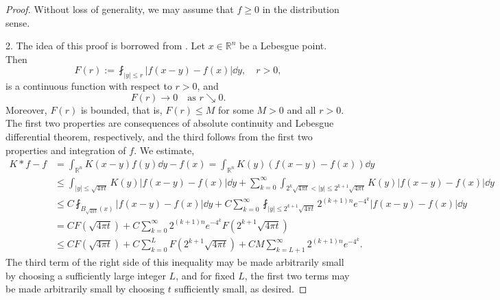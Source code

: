 \begin{proof}
	Without loss of generality, we may assume that $f\geq0$ in the distribution sense.
	
	2. The idea of this proof is borrowed from \cite[Theorem~2.1 in Chapter~3]{Stein2005}. Let $x\in\mathbb R^n$ be a Lebesgue point. Then  
	\[
	F(r) := \fint_{|y|\leq r} |f(x-y)-f(x)|\dd y,\quad r > 0,
	\]
	is a continuous function with respect to $r>0$,
	and 
	\[
	F(r)\to 0\quad \text{as }r\searrow0.
	\]
	Moreover, $F(r)$ is bounded, that is, $F(r)\leq M$ for some $M>0$ and all $r>0$. 
	The first two properties are consequences of absolute continuity and Lebesgue differential theorem, respectively, and the third follows from the first two properties and integration of $f$.
	We estimate,
	\begin{align*}
		K*f-f &= \int_{\mathbb{R}^n}K(x-y)f(y)\dd y - f(x) = \int_{\mathbb R^n}K(y)(f(x-y)-f(x))\dd y\\
		&\leq \int_{|y|\leq\sqrt {4\pi t}}K(y)|f(x-y)-f(x)|\dd y 
		+ \sum_{k=0}^{\infty}\int_{2^k\sqrt {4\pi t} < |y|\leq 2^{k+1}\sqrt {4\pi t}}K(y)|f(x-y)-f(x)|\dd y\\
		&\leq C\fint_{B_{\sqrt {4\pi t}}(x)}|f(x-y)-f(x)|\dd y 
			+ C\sum_{k=0}^\infty\fint_{|y|\leq 2^{k+1}\sqrt{4\pi t}}2^{(k+1)n}e^{-4^k}|f(x-y)-f(x)|\dd y \\
		&= CF(\sqrt{4\pi t}) + C\sum_{k=0}^\infty 2^{(k+1)n}e^{-4^k} F(2^{k+1}\sqrt{4\pi t})\\
		&\leq CF(\sqrt{4\pi t}) + C\sum_{k=0}^{L}F(2^{k+1}\sqrt{4\pi t}) + C M \sum_{k=L+1}^\infty 2^{(k+1)n}e^{-4^k}.
	\end{align*}
	The third term of the right side of this inequality may be made arbitrarily small 
  by choosing a sufficiently large integer $L$, 
  and for fixed $L$, the first two terms may be made arbitrarily small by choosing $t$ sufficiently small,
	as desired.


\end{proof}
